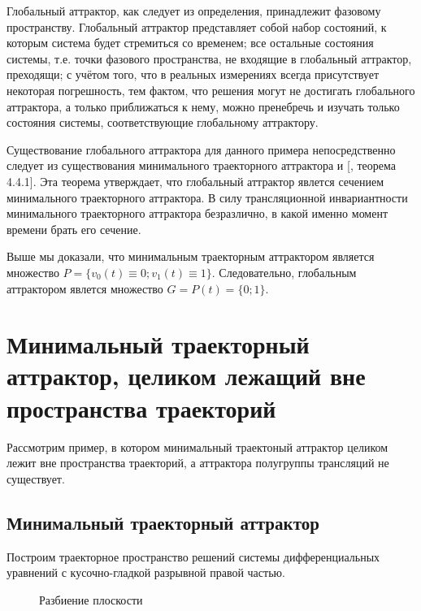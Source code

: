 Глобальный аттрактор, как следует из определения, принадлежит фазовому пространству.
Глобальный аттрактор представляет собой набор состояний, к которым система будет стремиться со временем;
все остальные состояния системы, т.е. точки фазового пространства, не входящие в глобальный аттрактор, преходящи;
с учётом того, что в реальных измерениях всегда присутствует некоторая погрешность, тем фактом, что решения могут не достигать глобального аттрактора, а только приближаться к нему, можно пренебречь и изучать только состояния системы, соответствующие глобальному аттрактору.

Существование глобального аттрактора для данного примера непосредственно следует из существования
минимального траекторного аттрактора и [\cite{Zelenaya}, теорема 4.4.1].
Эта теорема утверждает, что глобальный аттрактор явлется сечением минимального траекторного аттрактора.
В силу трансляционной инвариантности минимального траекторного аттрактора безразлично,
в какой именно момент времени брать его сечение.

Выше мы доказали, что минимальным траекторным аттрактором является множество $P=\{v_0(t)\equiv 0; v_1(t)\equiv 1\}$.
Следовательно, глобальным аттрактором явлется множество $G = P(t) = \{0; 1\}$.

\section{Минимальный траекторный аттрактор, целиком лежащий вне пространства траекторий}


Рассмотрим пример, в котором минимальный траектоный аттрактор целиком лежит вне пространства траекторий,
а аттрактора полугруппы трансляций не существует.


\subsection{Минимальный траекторный аттрактор}

Построим траекторное пространство решений системы дифференциальных уравнений с кусочно-гладкой разрывной правой частью.

\begin{figure}[h!]
	\caption{Разбиение плоскости}
	\label{fig:somelabel}
\end{figure}

